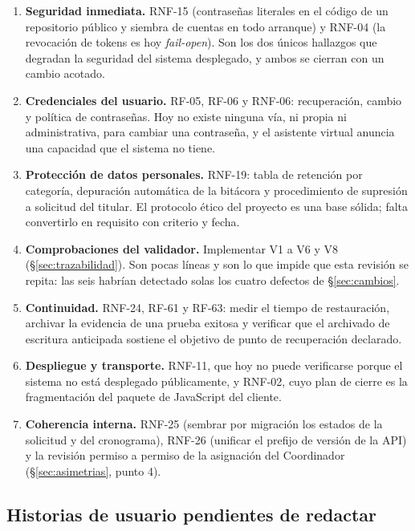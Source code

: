 \documentclass[11pt,a4paper]{article}
\begin{document}
\begin{enumerate}
    \item \textbf{Seguridad inmediata.} RNF-15 (contraseñas literales en el código de un
          repositorio público y siembra de cuentas en todo arranque) y RNF-04 (la revocación de
          tokens es hoy \emph{fail-open}). Son los dos únicos hallazgos que degradan la seguridad
          del sistema desplegado, y ambos se cierran con un cambio acotado.
    \item \textbf{Credenciales del usuario.} RF-05, RF-06 y RNF-06: recuperación, cambio y
          política de contraseñas. Hoy no existe ninguna vía, ni propia ni administrativa, para
          cambiar una contraseña, y el asistente virtual anuncia una capacidad que el sistema no
          tiene.
    \item \textbf{Protección de datos personales.} RNF-19: tabla de retención por categoría,
          depuración automática de la bitácora y procedimiento de supresión a solicitud del
          titular. El protocolo ético del proyecto es una base sólida; falta convertirlo en
          requisito con criterio y fecha.
    \item \textbf{Comprobaciones del validador.} Implementar V1 a V6 y V8
          (\S\ref{sec:trazabilidad}). Son pocas líneas y son lo que impide que esta revisión se
          repita: las seis habrían detectado solas los cuatro defectos de \S\ref{sec:cambios}.
    \item \textbf{Continuidad.} RNF-24, RF-61 y RF-63: medir el tiempo de restauración, archivar
          la evidencia de una prueba exitosa y verificar que el archivado de escritura anticipada
          sostiene el objetivo de punto de recuperación declarado.
    \item \textbf{Despliegue y transporte.} RNF-11, que hoy no puede verificarse porque el
          sistema no está desplegado públicamente, y RNF-02, cuyo plan de cierre es la
          fragmentación del paquete de JavaScript del cliente.
    \item \textbf{Coherencia interna.} RNF-25 (sembrar por migración los estados de la solicitud
          y del cronograma), RNF-26 (unificar el prefijo de versión de la API) y la revisión
          permiso a permiso de la asignación del Coordinador
          (\S\ref{sec:asimetrias}, punto 4).
\end{enumerate}

\subsection{Historias de usuario pendientes de redactar}
\end{document}
